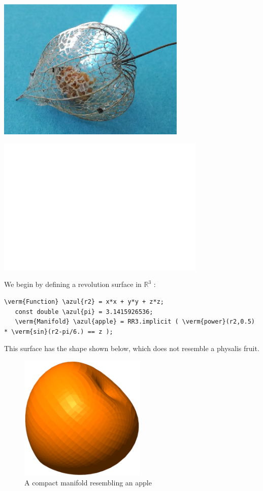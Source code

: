 {\vskip -3mm
\if{}
\centerline{\includegraphics[width=90mm]{dry-physalis}}
\else
{}
\centerline{\includegraphics[width=100mm]{fake-physalis}}
\fi}
\vfil\eject

We begin by defining a revolution surface in $ \mathbb{R}^3 $ :

\begin{Verbatim}[commandchars=\\\{\},formatcom=\small\tt,frame=single,
   label=main-\ref{\numb section 2.\numb parag 10}.cpp,rulecolor=\color{coment},
   baselinestretch=0.94,framesep=2mm]
   \verm{Function} \azul{r2} = x*x + y*y + z*z;
   const double \azul{pi} = 3.1415926536;
   \verm{Manifold} \azul{apple} = RR3.implicit ( \verm{power}(r2,0.5) * \verm{sin}(r2-pi/6.) == z );
\end{Verbatim}

This surface has the shape shown below, which does not resemble a physalis fruit.

\begin{figure}[ht] \centering
  \includegraphics[width=60mm]{fisalis-manif}
  \caption{A compact manifold resembling an apple}
  \label{\numb section 2.\numb fig 11}
\end{figure}

